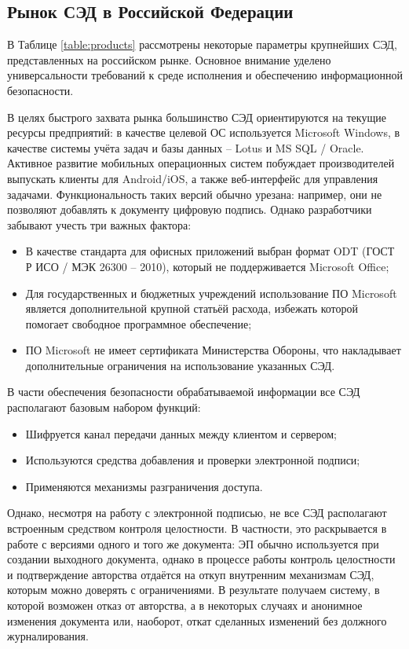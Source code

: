 \subsection{Рынок СЭД в Российской Федерации} \label{review_products}

В Таблице \ref{table:products} рассмотрены некоторые параметры крупнейших СЭД, представленных на российском рынке. Основное внимание уделено универсальности требований к среде исполнения и обеспечению информационной безопасности.

\vspace{\baselineskip}
В целях быстрого захвата рынка большинство СЭД ориентируются на текущие ресурсы предприятий: в качестве целевой ОС используется Microsoft Windows, в качестве системы учёта задач и базы данных – Lotus и MS SQL / Oracle. Активное развитие мобильных операционных систем побуждает производителей выпускать клиенты для Android/iOS, а также веб-интерфейс для управления задачами. Функциональность таких версий обычно урезана: например, они не позволяют добавлять к документу цифровую подпись. Однако разработчики забывают учесть три важных фактора:
\begin{itemize}
	\item В качестве стандарта для офисных приложений выбран формат ODT (ГОСТ Р ИСО / МЭК 26300 -- 2010), который не поддерживается Microsoft Office;
	\item Для государственных и бюджетных учреждений использование ПО Microsoft является дополнительной крупной статьёй расхода, избежать которой помогает свободное программное обеспечение;
	\item ПО Microsoft не имеет сертификата Министерства Обороны, что накладывает дополнительные ограничения на использование указанных СЭД.
\end{itemize}

В части обеспечения безопасности обрабатываемой информации все СЭД располагают базовым набором функций:
\begin{itemize}
	\item Шифруется канал передачи данных между клиентом и сервером;
	\item Используются средства добавления и проверки электронной подписи;
	\item Применяются механизмы разграничения доступа.
\end{itemize}

Однако, несмотря на работу с электронной подписью, не все СЭД располагают встроенным средством контроля целостности. В частности, это раскрывается в работе с версиями одного и того же документа: ЭП обычно используется при создании выходного документа, однако в процессе работы контроль целостности и подтверждение авторства отдаётся на откуп внутренним механизмам СЭД, которым можно доверять с ограничениями. В результате получаем систему, в которой возможен отказ от авторства, а в некоторых случаях и анонимное изменения документа или, наоборот, откат сделанных изменений без должного журналирования.

